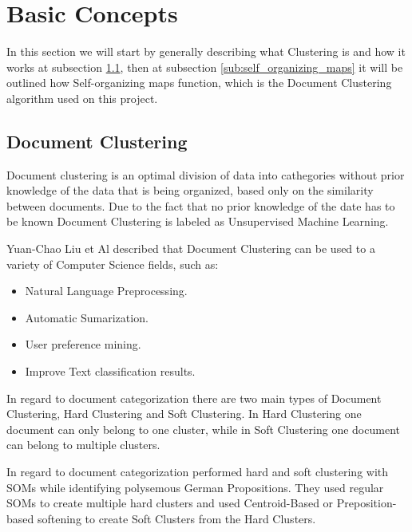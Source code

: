 \section{Basic Concepts} %
\label{sec:basic_concepts}
In this section we will start by generally describing what Clustering is and how it works at subsection \ref{sub:clustering}, then at subsection \ref{sub:self_organizing_maps} it will be outlined how Self-organizing \cite{Kohonen1990}maps function, which is the Document Clustering algorithm used on this project.


\subsection{Document Clustering} %
\label{sub:clustering}
Document clustering is an optimal division of data into cathegories without prior knowledge of the data that is being organized, based only on the similarity between documents. Due to the fact that no prior knowledge of the date has to be known Document Clustering is labeled as Unsupervised Machine Learning.

Yuan-Chao Liu et Al \cite{Liu2012b} described that Document Clustering can be used to a variety of Computer Science fields, such as:
\begin{itemize}
  \item Natural Language Preprocessing.
  \item Automatic Sumarization.
  \item User preference mining.
  \item Improve Text classification results.
\end{itemize}

In regard to document categorization there are two main types of Document Clustering, Hard Clustering and Soft Clustering. In Hard Clustering one document can only belong to one cluster, while in Soft Clustering one document can belong to multiple clusters. 

In regard to document categorization \citet{Springorum1998} performed hard and soft clustering with SOMs \citep{Kohonen1990} while identifying polysemous German Propositions. They used regular SOMs to create multiple hard clusters and used Centroid-Based or Preposition-based softening to create Soft Clusters from the Hard Clusters.

